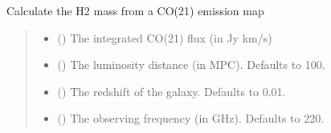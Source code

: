 \documentclass[letterpaper,10pt,english]{sphinxmanual}
\begin{document}
\label{\detokenize{modules:module-cubespa.utils}}

\begin{fulllineitems}
\label{\detokenize{modules:cubespa.utils.H2_Mass}}
\pysigstartsignatures
{}
\pysigstopsignatures
\sphinxAtStartPar
Calculate the H2 mass from a CO(2\sphinxhyphen{}1) emission map
\begin{quote}\begin{description}
\begin{itemize}
\item {} 
\sphinxAtStartPar
{} () \textendash{} The integrated CO(2\sphinxhyphen{}1) flux (in Jy km/s)

\item {} 
\sphinxAtStartPar
{} (\sphinxstyleliteralemphasis{\sphinxupquote{, }}) \textendash{} The luminosity distance (in MPC). Defaults to 100.

\item {} 
\sphinxAtStartPar
{} (\sphinxstyleliteralemphasis{\sphinxupquote{, }}) \textendash{} The redshift of the galaxy. Defaults to 0.01.

\item {} 
\sphinxAtStartPar
{} (\sphinxstyleliteralemphasis{\sphinxupquote{, }}) \textendash{} The observing frequency (in GHz). Defaults to 220.


\end{itemize}
\end{description}
\end{quote}
\end{fulllineitems}
\end{document}
